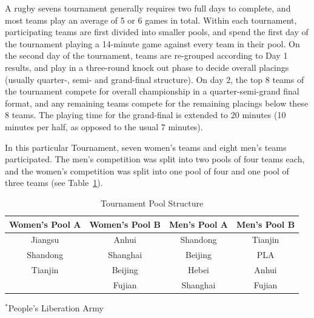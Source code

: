 A rugby sevens tournament generally requires two full days to complete, and most teams play an average of 5 or 6 games in total. Within each tournament, participating teams are first divided into smaller pools, and spend the first day of the tournament playing a 14-minute game against every team in their pool. On the second day of the tournament, teams are re-grouped according to Day 1 results, and play in a three-round knock out phase to decide overall placings (usually quarter-, semi- and grand-final structure). On day 2, the top 8 teams of the tournament compete for overall championship in a quarter-semi-grand final format, and any remaining teams compete for the remaining placings below these 8 teams. The playing time for the grand-final is extended to 20 minutes (10 minutes per half, as opposed to the usual 7 minutes).

In this particular Tournament, seven women's teams and eight men's teams participated.  The men’s competition was split into two pools of four teams each, and the women’s competition was split into one pool of four and one pool of three teams (see Table~\ref{tab:poolStructure}). \\


\begin{table}[htpb]\caption{Tournament Pool Structure}
  \begin{center}
    \begin{small}
        \begin{tabular}{| c | c || c | c |}
          \hline
          \bf Women's Pool A & \bf Women's Pool B &  \bf Men's Pool A & \bf  Men's Pool B \\
          \hline
          Jiangsu & Anhui & Shandong & Tianjin \\
          Shandong & Shanghai & Beijing & PLA\superscript{*} \\
          Tianjin & Beijing & Hebei & Anhui \\
             & Fujian & Shanghai & Fujian \\
             \hline
        \end{tabular}
          \end{small}
        \end{center}

        \begin{footnotesize}
          $^*$People's Liberation Army
        \end{footnotesize}

  \label{tab:poolStructure}
    \end{table}



